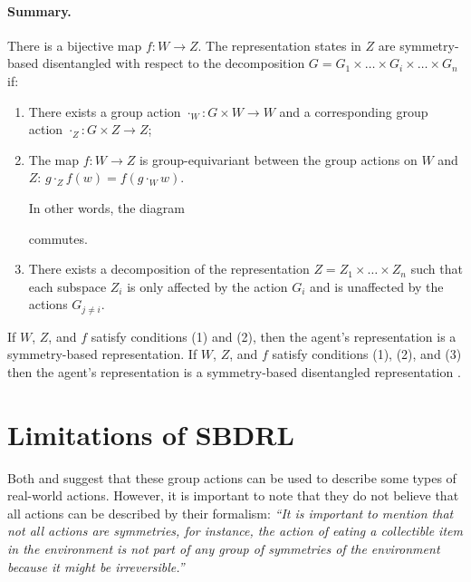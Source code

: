 \paragraph{Summary.}
There is a bijective map $f: W \to Z$.
The representation states in $Z$ are symmetry-based disentangled with respect to the decomposition $G = G_1 \times \hdots \times G_i \times \hdots \times G_n$ if:
\begin{enumerate}[(1)]
	\item There exists a group action $\cdot_{W}: G \times W \to W$ and a corresponding group action $\cdot_{Z}: G \times Z \to Z$;
	\item The map $f : W \to Z$ is group-equivariant between the group actions on $W$ and $Z$: $g \cdot_{Z} f(w) = f(g \cdot_{W} w)$.

	      In other words, the diagram
	      
	      commutes.

	\item There exists a decomposition of the representation $Z = Z_1 \times \hdots \times Z_n$ such that each subspace $Z_i$ is only affected by the action $G_i$ and is unaffected by the actions $G_{j \neq i}$.
\end{enumerate}

If $W$, $Z$, and $f$ satisfy conditions (1) and (2), then the agent's representation is a symmetry-based representation.
If $W$, $Z$, and $f$ satisfy conditions (1), (2), and (3) then the agent's representation is a symmetry-based disentangled representation \autocite{caselles2019symmetry}.

\section{Limitations of SBDRL}

Both \autocite{Higgins2018} and \autocite{caselles2019symmetry} suggest that these group actions can be used to describe some types of real-world actions.
However, it is important to note that they do not believe that all actions can be described by their formalism: \textit{``It is important to mention that not all actions are symmetries, for instance, the action of eating a collectible item in the environment is not part of any group of symmetries of the environment because it might be irreversible.''}

